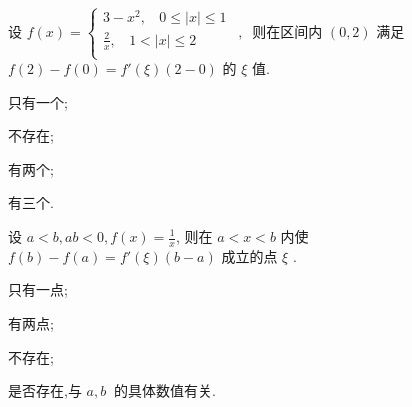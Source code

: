 \begin{problem}
设 $f(x) = \left\{ \begin{matrix}
3 - x^{2},\ \ \ \ 0 \leq |x| \leq 1 \\
\displaystyle \frac{2}{x},\ \ \ \ 1 < |x| \leq 2 \\
\end{matrix}\ \ , \right.\ $ 则在区间内 $(0,2)$ 满足
$f\left( 2 \right) - f\left( 0 \right) = f'\left( \xi \right)\left( 2 - 0 \right)$
的 $\xi$ 值.

\begin{abcd} \item 只有一个;

\item 不存在;

\item 有两个;

\item 有三个.

\end{abcd}

\end{problem}

\begin{problem}
设 $a < b,ab < 0,f\left( x \right) =\displaystyle  \frac{1}{x}$, 则在
$a < x < b$ 内使
$f\left( b \right) - f\left( a \right) = f'\left( \xi \right)\left( b - a \right)$
成立的点 $\xi$ .

\begin{abcd} \item 只有一点;

\item 有两点;

\item 不存在;

\item 是否存在,与 $a,b\ $ 的具体数值有关.

\end{abcd}

\end{problem}

